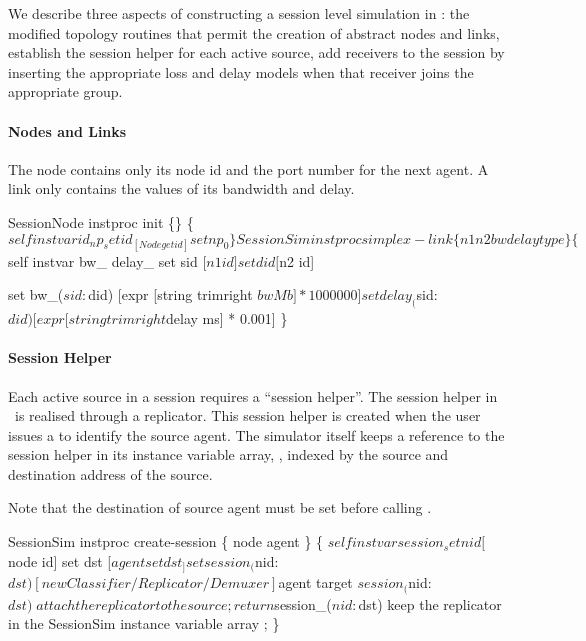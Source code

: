 We describe three aspects of constructing a session level simulation in
\ns:
the modified topology routines that permit the creation of abstract
nodes and links,
establish the session helper for each active source,
add receivers to the session by inserting the appropriate loss and delay
models when that receiver joins the appropriate group.

\paragraph{Nodes and Links}
The node contains only its node id and the port number for the next agent.
A link only contains the values of its bandwidth and delay.

\begin{program}
SessionNode instproc init \{\} \{
    $self instvar id_ np_
    set id_ [Node getid]
    set np_ 0
\}

SessionSim instproc simplex-link \{ n1 n2 bw delay type \} \{
    $self instvar bw_ delay_
    set sid [$n1 id]
    set did [$n2 id]

    set bw_($sid:$did) [expr [string trimright $bw Mb] * 1000000]
    set delay_($sid:$did) [expr [string trimright $delay ms] * 0.001]
\}
\end{program}

\paragraph{Session Helper}
Each active source in a session requires a ``session helper''.
The session helper in \ns\ is realised through a replicator.
This session helper is created when the user issues a
 to identify the source agent.
The simulator itself keeps a reference to the session helper
in its instance variable array, ,
indexed by the source and destination address of the source.

Note that the destination of source agent must be set before
calling .

\begin{program}
SessionSim instproc create-session \{ node agent \} \{
    $self instvar session_

    set nid [$node id]
    set dst [$agent set dst_]
    set session_($nid:$dst) [new Classifier/Replicator/Demuxer]
    $agent target $session_($nid:$dst) \; attach the replicator to the source;
    return $session_($nid:$dst) \; keep the replicator in the SessionSim instance variable array ;
\}
\end{program}

